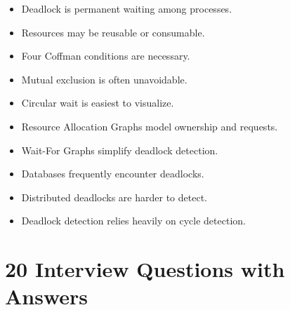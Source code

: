 \begin{itemize}
\item Deadlock is permanent waiting among processes.
\item Resources may be reusable or consumable.
\item Four Coffman conditions are necessary.
\item Mutual exclusion is often unavoidable.
\item Circular wait is easiest to visualize.
\item Resource Allocation Graphs model ownership and requests.
\item Wait-For Graphs simplify deadlock detection.
\item Databases frequently encounter deadlocks.
\item Distributed deadlocks are harder to detect.
\item Deadlock detection relies heavily on cycle detection.
\end{itemize}

\section{20 Interview Questions with Answers}

